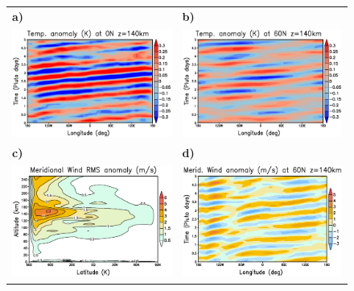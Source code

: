 \begin{figure}
  \begin{center}
\begin{tabular}[h]{ll}
\hspace{-2.cm} {\bf a)}  & {\bf b)} \\
\hspace{-2.cm}
\includegraphics[width=8.cm,angle=-0,clip]{figures/wave_T_0N_140km.eps} &
\includegraphics[width=8.cm,angle=-0,clip]{figures/wave_T_60N_140km.eps} \\
\hspace{-2.cm} {\bf c)} & {\bf d)} \\
\hspace{-2.cm}
\includegraphics[width=8.cm,angle=-0,clip]{figures/rms_v_pole.eps} &
\includegraphics[width=8.cm,angle=-0,clip]{figures/wave_V_60N_140km.eps} \\

\end{tabular}
\end{center}
\end{figure}
